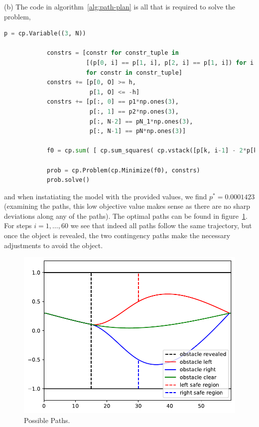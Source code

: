 \documentclass[12pt,reqno]{article}
\theoremstyle{definition}
\numberwithin{equation}{section}
\begin{document}
\noindent (b) The code in algorithm~\ref{alg:path-plan} is all that is required to solve the problem,
\begin{algorithm}[htbp]
    \caption{Path Planning Code}
    \centering
        \begin{lstlisting}[language=Python]
            p = cp.Variable((3, N))

            constrs = [constr for constr_tuple in
                       [(p[0, i] == p[1, i], p[2, i] == p[1, i]) for i in range(2, S+1)]
                       for constr in constr_tuple]
            constrs += [p[0, O] >= h,
                        p[1, O] <= -h]
            constrs += [p[:, 0] == p1*np.ones(3),
                        p[:, 1] == p2*np.ones(3),
                        p[:, N-2] == pN_1*np.ones(3),
                        p[:, N-1] == pN*np.ones(3)]
            
            f0 = cp.sum( [ cp.sum_squares( cp.vstack([p[k, i-1] - 2*p[k, i] + p[k, i+1] for i in range(2, N-2)]) ) for k in range(3)] )
            
            prob = cp.Problem(cp.Minimize(f0), constrs)
            prob.solve()
        \end{lstlisting}
    \label{alg:path-plan}
\end{algorithm}
and when instatiating the model with the provided values, we find $p^* = 0.0001423$ (examining
the paths, this low objective value makes sense as there are no sharp deviations
along any of the paths). 
The optimal paths can be found in figure~\ref{fig:path_plan}. For steps $i=1, \ldots, 60$ we see that
indeed all paths follow the same trajectory, but once the object is revealed, the two contingency paths
make the necessary adjustments to avoid the object.


\begin{figure}[htbp]
    \centering
    \includegraphics[width=\linewidth]{../examples/364a/path_plan_cont.pdf}
    \caption{Possible Paths.}
    \label{fig:path_plan}
\end{figure}
\end{document}
